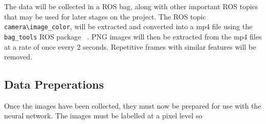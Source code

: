 \documentclass[10pt,twocolumn,letterpaper]{article}
\begin{document}
The data will be collected in a ROS bag, along with other important ROS topics that may be used
for later stages on the project. The ROS topic \verb|camera\image_color|, will be extracted and 
converted into a mp4 file using the \verb|bag_tools| ROS package ~\cite{bagtools}. PNG images
will then be extracted from the mp4 files at a rate of once every 2 seconds. Repetitive frames
with similar features will be removed.

\subsection{Data Preperations}
Once the images have been collected, they must now be prepared for use with the neural network.
The images must be labelled at a pixel level so 





{\small


}
\end{document}
